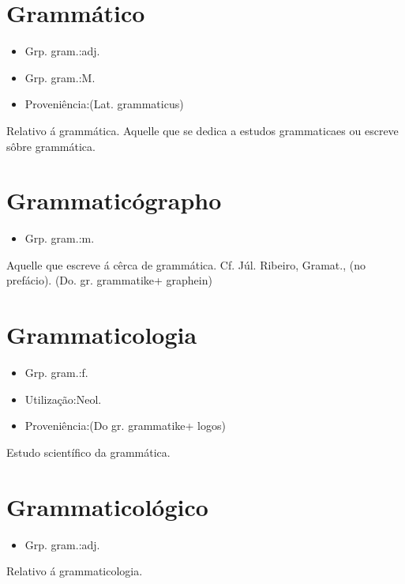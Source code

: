 \section{Grammático}
\begin{itemize}
\item {Grp. gram.:adj.}
\end{itemize}
\begin{itemize}
\item {Grp. gram.:M.}
\end{itemize}
\begin{itemize}
\item {Proveniência:(Lat. \textunderscore grammaticus\textunderscore )}
\end{itemize}
Relativo á grammática.
Aquelle que se dedica a estudos grammaticaes ou escreve sôbre grammática.
\section{Grammaticógrapho}
\begin{itemize}
\item {Grp. gram.:m.}
\end{itemize}
Aquelle que escreve á cêrca de grammática. Cf. Júl. Ribeiro, \textunderscore Gramat.\textunderscore , (no prefácio).
(Do. gr. \textunderscore grammatike\textunderscore  + \textunderscore graphein\textunderscore )
\section{Grammaticologia}
\begin{itemize}
\item {Grp. gram.:f.}
\end{itemize}
\begin{itemize}
\item {Utilização:Neol.}
\end{itemize}
\begin{itemize}
\item {Proveniência:(Do gr. \textunderscore grammatike\textunderscore  + \textunderscore logos\textunderscore )}
\end{itemize}
Estudo scientífico da grammática.
\section{Grammaticológico}
\begin{itemize}
\item {Grp. gram.:adj.}
\end{itemize}
Relativo á grammaticologia.
